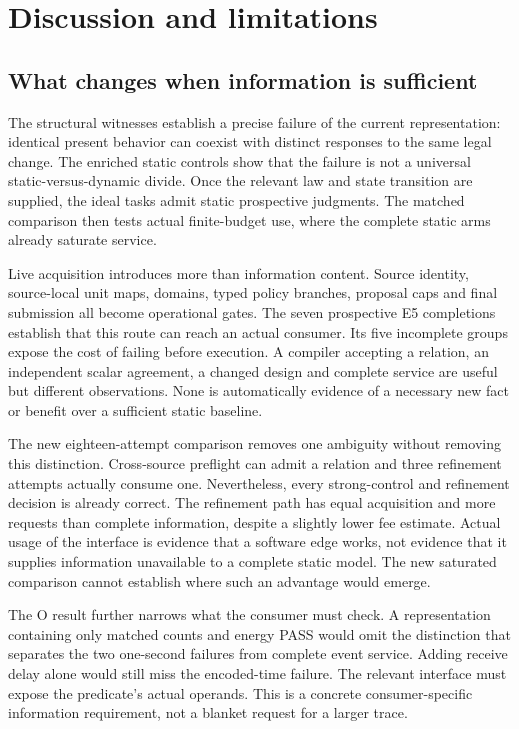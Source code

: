 \section{Discussion and limitations}
\subsection{What changes when information is sufficient}
The structural witnesses establish a precise failure of the current
representation: identical present behavior can coexist with distinct
responses to the same legal change. The enriched static controls
show that the failure is not a universal static-versus-dynamic
divide. Once the relevant law and state transition are supplied,
the ideal tasks admit static prospective judgments. The matched
comparison then tests actual finite-budget use, where the complete
static arms already saturate service.

Live acquisition introduces more than information content. Source
identity, source-local unit maps, domains, typed policy branches,
proposal caps and final submission all become operational gates.
The seven prospective E5 completions establish that this route can
reach an actual consumer. Its five incomplete groups expose the
cost of failing before execution. A compiler accepting a relation,
an independent scalar agreement, a changed design and complete
service are useful but different observations. None is automatically
evidence of a necessary new fact or benefit over a sufficient static
baseline.

The new eighteen-attempt comparison removes one ambiguity without removing
this distinction. Cross-source preflight can admit a relation and three
refinement attempts actually consume one. Nevertheless, every strong-control
and refinement decision is already correct. The refinement path has equal
acquisition and more requests than complete information, despite a slightly
lower fee estimate. Actual usage of the interface is evidence that a software
edge works, not evidence that it supplies information unavailable to a complete
static model. The new saturated comparison cannot establish where such an
advantage would emerge.

The O result further narrows what the consumer must check. A
representation containing only matched counts and energy PASS
would omit the distinction that separates the two one-second
failures from complete event service. Adding receive delay alone
would still miss the encoded-time failure. The relevant interface
must expose the predicate's actual operands. This is a concrete
consumer-specific information requirement, not a blanket request
for a larger trace.

